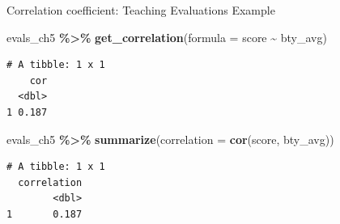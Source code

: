 \documentclass[
  ignorenonframetext,
]{beamer}
\newenvironment{Shaded}{\begin{snugshade}}{\end{snugshade}}
\newcommand{\AttributeTok}[1]{\textcolor[rgb]{0.13,0.29,0.53}{#1}}
\newcommand{\FunctionTok}[1]{\textcolor[rgb]{0.13,0.29,0.53}{\textbf{#1}}}
\newcommand{\NormalTok}[1]{#1}
\newcommand{\SpecialCharTok}[1]{\textcolor[rgb]{0.81,0.36,0.00}{\textbf{#1}}}
\begin{document}
\begin{frame}[fragile]{Correlation coefficient: Teaching Evaluations
Example}
\protect\hypertarget{correlation-coefficient-teaching-evaluations-example}{}
\normalsize

\begin{Shaded}
\begin{Highlighting}[]
\NormalTok{evals\_ch5 }\SpecialCharTok{\%\textgreater{}\%} 
  \FunctionTok{get\_correlation}\NormalTok{(}\AttributeTok{formula =}\NormalTok{ score }\SpecialCharTok{\textasciitilde{}}\NormalTok{ bty\_avg)}
\end{Highlighting}
\end{Shaded}

\begin{verbatim}
# A tibble: 1 x 1
    cor
  <dbl>
1 0.187
\end{verbatim}

\normalsize

\normalsize

\begin{Shaded}
\begin{Highlighting}[]
\NormalTok{evals\_ch5 }\SpecialCharTok{\%\textgreater{}\%} 
  \FunctionTok{summarize}\NormalTok{(}\AttributeTok{correlation =} \FunctionTok{cor}\NormalTok{(score, bty\_avg))}
\end{Highlighting}
\end{Shaded}

\begin{verbatim}
# A tibble: 1 x 1
  correlation
        <dbl>
1       0.187
\end{verbatim}

\normalsize
\end{frame}
\end{document}
